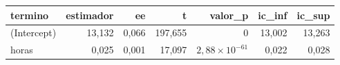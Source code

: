 \begin{tabular}{lrrrrrr}
\toprule
termino & estimador & ee & t & valor\_p & ic\_inf & ic\_sup \\
\midrule
(Intercept) & 13,132 & 0,066 & 197,655 & 0 & 13,002 & 13,263 \\
horas & 0,025 & 0,001 & 17,097 & $2,88 \times 10^{-61}$ & 0,022 & 0,028 \\
\bottomrule
\end{tabular}

